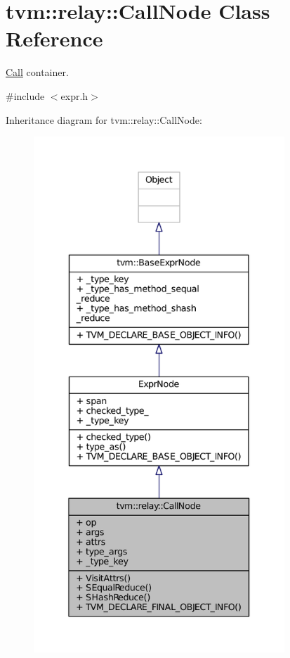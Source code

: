 \hypertarget{classtvm_1_1relay_1_1CallNode}{}\section{tvm\+:\+:relay\+:\+:Call\+Node Class Reference}
\label{classtvm_1_1relay_1_1CallNode}


\hyperlink{classtvm_1_1relay_1_1Call}{Call} container.  




{\ttfamily \#include $<$expr.\+h$>$}



Inheritance diagram for tvm\+:\+:relay\+:\+:Call\+Node\+:
\nopagebreak
\begin{figure}[H]
\begin{center}
\leavevmode
\includegraphics[height=550pt]{classtvm_1_1relay_1_1CallNode__inherit__graph}
\end{center}
\end{figure}


